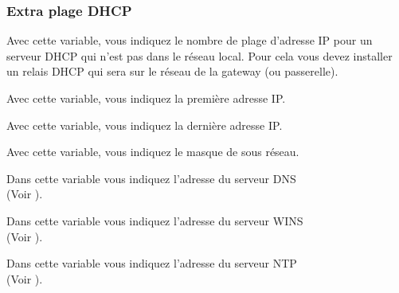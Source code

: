 \subsubsection{Extra plage DHCP}

\begin{description}

    {Avec cette variable, vous indiquez le nombre de plage d'adresse IP pour un serveur
	DHCP qui n'est pas dans le réseau local. Pour cela vous devez installer un relais
	DHCP qui sera sur le réseau de la gateway (ou passerelle).}


    {Avec cette variable, vous indiquez la première adresse IP.}


    {Avec cette variable, vous indiquez la dernière adresse IP.}


    {Avec cette variable, vous indiquez le masque de sous réseau.}


    {Dans cette variable vous indiquez l'adresse du serveur DNS \\
    (Voir ).}


    {Dans cette variable vous indiquez l'adresse du serveur WINS \\
    (Voir ).}
    

    {Dans cette variable vous indiquez l'adresse du serveur NTP \\
    (Voir ).}
 


\end{description}
